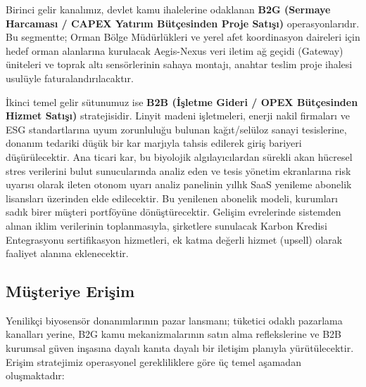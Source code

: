 \documentclass[11pt,a4paper]{article}
\begin{document}
Birinci gelir kanalımız, devlet kamu ihalelerine odaklanan \textbf{B2G (Sermaye Harcaması / CAPEX Yatırım Bütçesinden Proje Satışı)} operasyonlarıdır. Bu segmentte; Orman Bölge Müdürlükleri ve yerel afet koordinasyon daireleri için hedef orman alanlarına kurulacak Aegis-Nexus veri iletim ağ geçidi (Gateway) üniteleri ve toprak altı sensörlerinin sahaya montajı, anahtar teslim proje ihalesi usulüyle faturalandırılacaktır.

İkinci temel gelir sütunumuz ise \textbf{B2B (İşletme Gideri / OPEX Bütçesinden Hizmet Satışı)} stratejisidir. Linyit madeni işletmeleri, enerji nakil firmaları ve ESG standartlarına uyum zorunluluğu bulunan kağıt/selüloz sanayi tesislerine, donanım tedariki düşük bir kar marjıyla tahsis edilerek giriş bariyeri düşürülecektir. Ana ticari kar, bu biyolojik algılayıcılardan sürekli akan hücresel stres verilerini bulut sunucularında analiz eden ve tesis yönetim ekranlarına risk uyarısı olarak ileten otonom uyarı analiz panelinin yıllık SaaS yenileme abonelik lisansları üzerinden elde edilecektir. Bu yenilenen abonelik modeli, kurumları sadık birer müşteri portföyüne dönüştürecektir. Gelişim evrelerinde sistemden alınan iklim verilerinin toplanmasıyla, şirketlere sunulacak Karbon Kredisi Entegrasyonu sertifikasyon hizmetleri, ek katma değerli hizmet (upsell) olarak faaliyet alanına eklenecektir.

\subsection{Müşteriye Erişim}

Yenilikçi biyosensör donanımlarının pazar lansmanı; tüketici odaklı pazarlama kanalları yerine, B2G kamu mekanizmalarının satın alma reflekslerine ve B2B kurumsal güven inşasına dayalı kanıta dayalı bir iletişim planıyla yürütülecektir. Erişim stratejimiz operasyonel gerekliliklere göre üç temel aşamadan oluşmaktadır:
\end{document}
